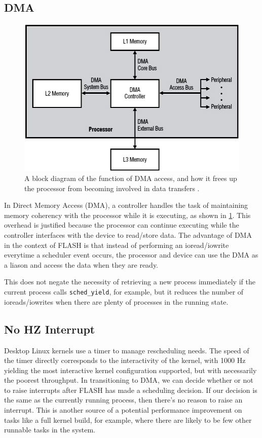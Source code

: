 \documentclass{sig-alternate-10pt}
\begin{document}
\subsection{DMA}
\begin{figure}
	\begin{center}
		\includegraphics[width=0.9\linewidth]{fig/dma.jpg}
		\caption{
			A block diagram of the function of DMA access, and how it frees up the processor from becoming involved in data transfers \protect\cite{fig:dma}.
		}
		\label{fig:dma_diag}
	\end{center}
\end{figure}
In Direct Memory Access (DMA), a controller handles the task of maintaining memory coherency with the processor while it is executing, as shown in \ref{fig:dma_diag}. This overhead is justified because the processor can continue executing while the controller interfaces with the device to read/store data. The advantage of DMA in the context of FLASH is that instead of performing an ioread/iowrite everytime a scheduler event occurs, the processor and device can use the DMA as a liason and access the data when they are ready.

This does not negate the necessity of retrieving a new process immediately if the current process calls \verb|sched_yield|, for example, but it reduces the number of ioreads/iowrites when there are plenty of processes in the running state.

\subsection{No HZ Interrupt}
Desktop Linux kernels use a timer to manage rescheduling needs. The speed of the timer directly corresponds to the interactivity of the kernel, with 1000 Hz yielding the most interactive kernel configuration supported, but with necessarily the poorest throughput. In transitioning to DMA, we can decide whether or not to raise interrupts after FLASH has made a scheduling decision. If our decision is the same as the currently running process, then there's no reason to raise an interrupt. This is another source of a potential performance improvement on tasks like a full kernel build, for example, where there are likely to be few other runnable tasks in the system.
\end{document}
